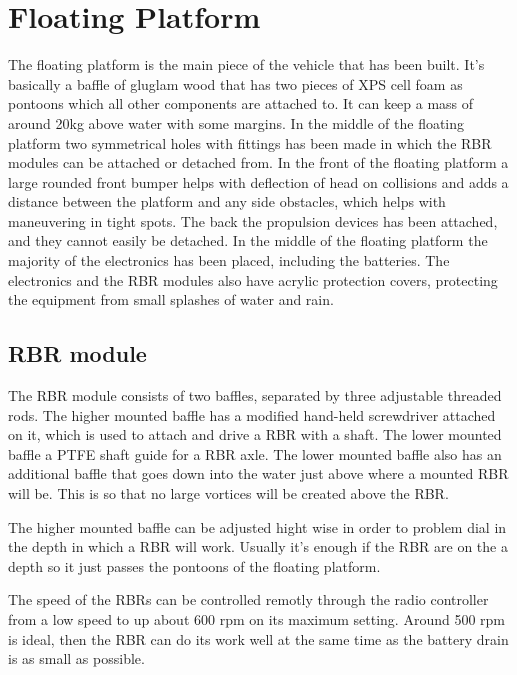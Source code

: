 \section{Floating Platform}
The floating platform is the main piece of the vehicle that has been built. It's basically a baffle of gluglam wood that has two pieces of XPS cell foam as pontoons which all other components are attached to. It can keep a mass of around 20kg above water with some margins. In the middle of the floating platform two symmetrical holes with fittings has been made in which the RBR modules can be attached or detached from. In the front of the floating platform a large rounded front bumper helps with deflection of head on collisions and adds a distance between the platform and any side obstacles, which helps with maneuvering in tight spots. The back the propulsion devices has been attached, and they cannot easily be detached. In the middle of the floating platform the majority of the electronics has been placed, including the batteries. The electronics and the RBR modules also have acrylic protection covers, protecting the equipment from small splashes of water and rain.           

\subsection{RBR module}
The RBR module consists of two baffles, separated by three adjustable threaded rods. The higher mounted baffle has a modified hand-held screwdriver attached on it, which is used to attach and drive a RBR with a shaft. The lower mounted baffle a PTFE shaft guide for a RBR axle. The lower mounted baffle also has an additional baffle that goes down into the water just above where a mounted RBR will be. This is so that no large vortices will be created above the RBR. 

The higher mounted baffle can be adjusted hight wise in order to problem dial in the depth in which a RBR will work. Usually it's enough if the RBR are on the a depth so it just passes the pontoons of the floating platform.

The speed of the RBRs can be controlled remotly through the radio controller from a low speed to up about 600 rpm on its maximum setting. Around 500 rpm is ideal, then the RBR can do its work well at the same time as the battery drain is as small as possible. 

